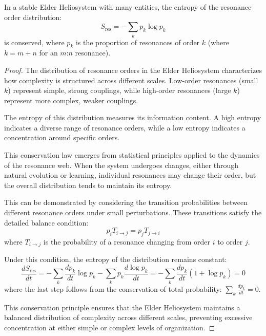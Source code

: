 \begin{theorem}
In a stable Elder Heliosystem with many entities, the entropy of the resonance order distribution:
\begin{equation}
S_{\text{res}} = -\sum_k p_k \log p_k
\end{equation}
is conserved, where $p_k$ is the proportion of resonances of order $k$ (where $k = m + n$ for an $m$:$n$ resonance).
\end{theorem}

\begin{proof}
The distribution of resonance orders in the Elder Heliosystem characterizes how complexity is structured across different scales. Low-order resonances (small $k$) represent simple, strong couplings, while high-order resonances (large $k$) represent more complex, weaker couplings.

The entropy of this distribution measures its information content. A high entropy indicates a diverse range of resonance orders, while a low entropy indicates a concentration around specific orders.

This conservation law emerges from statistical principles applied to the dynamics of the resonance web. When the system undergoes changes, either through natural evolution or learning, individual resonances may change their order, but the overall distribution tends to maintain its entropy.

This can be demonstrated by considering the transition probabilities between different resonance orders under small perturbations. These transitions satisfy the detailed balance condition:
\begin{equation}
p_i T_{i \to j} = p_j T_{j \to i}
\end{equation}
where $T_{i \to j}$ is the probability of a resonance changing from order $i$ to order $j$.

Under this condition, the entropy of the distribution remains constant:
\begin{equation}
\frac{dS_{\text{res}}}{dt} = -\sum_k \frac{dp_k}{dt} \log p_k - \sum_k p_k \frac{d\log p_k}{dt} = -\sum_k \frac{dp_k}{dt} (1 + \log p_k) = 0
\end{equation}
where the last step follows from the conservation of total probability: $\sum_k \frac{dp_k}{dt} = 0$.

This conservation principle ensures that the Elder Heliosystem maintains a balanced distribution of complexity across different scales, preventing excessive concentration at either simple or complex levels of organization.
\end{proof}

